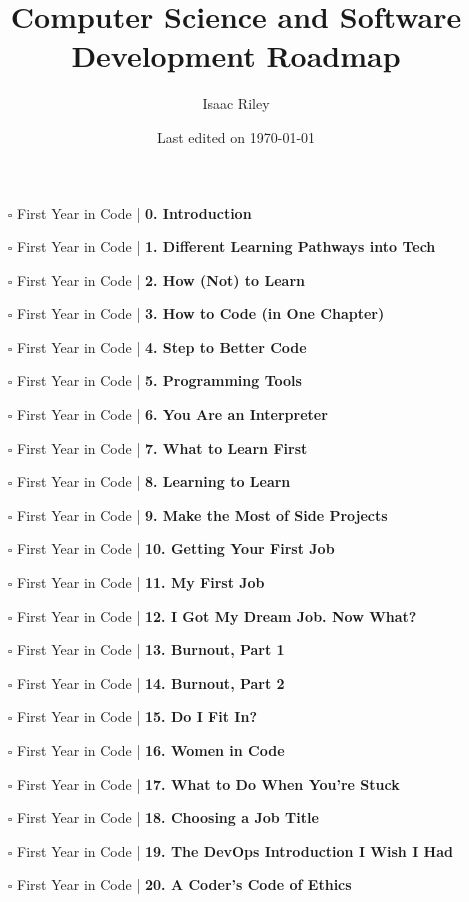 \documentclass[a4, landscape, 12pt]{article}
\title{Computer Science and Software Development Roadmap}
\author{Isaac Riley}
\date{Last edited on \today}
\newcommand{\checkbox}{$\square$}%
\begin{document}
\maketitle
\begin{itemize}
\item [\checkbox]  First Year in Code | \textbf{ 0. Introduction
}
\item [\checkbox]  First Year in Code | \textbf{ 1. Different Learning Pathways into Tech
}
\item [\checkbox]  First Year in Code | \textbf{ 2. How (Not) to Learn
}
\item [\checkbox]  First Year in Code | \textbf{ 3. How to Code (in One Chapter)
}
\item [\checkbox]  First Year in Code | \textbf{ 4. Step to Better Code
}
\item [\checkbox]  First Year in Code | \textbf{ 5. Programming Tools
}
\item [\checkbox]  First Year in Code | \textbf{ 6. You Are an Interpreter
}
\item [\checkbox]  First Year in Code | \textbf{ 7. What to Learn First
}
\item [\checkbox]  First Year in Code | \textbf{ 8. Learning to Learn
}
\item [\checkbox]  First Year in Code | \textbf{ 9. Make the Most of Side Projects
}
\item [\checkbox]  First Year in Code | \textbf{ 10. Getting Your First Job
}
\item [\checkbox]  First Year in Code | \textbf{ 11. My First Job
}
\item [\checkbox]  First Year in Code | \textbf{ 12. I Got My Dream Job. Now What?
}
\item [\checkbox]  First Year in Code | \textbf{ 13. Burnout, Part 1
}
\item [\checkbox]  First Year in Code | \textbf{ 14. Burnout, Part 2
}
\item [\checkbox]  First Year in Code | \textbf{ 15. Do I Fit In?
}
\item [\checkbox]  First Year in Code | \textbf{ 16. Women in Code
}
\item [\checkbox]  First Year in Code | \textbf{ 17. What to Do When You're Stuck
}
\item [\checkbox]  First Year in Code | \textbf{ 18. Choosing a Job Title
}
\item [\checkbox]  First Year in Code | \textbf{ 19. The DevOps Introduction I Wish I Had
}
\item [\checkbox]  First Year in Code | \textbf{ 20. A Coder's Code of Ethics
}
\end{itemize}
\end{document}
